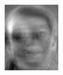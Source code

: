 \begin{frame}
\begin{columns}
\begin{overlayarea}{\textwidth}{\textheight}
{\begin{minipage}[t]{0.15\textwidth}
          \includegraphics[width=\textwidth]{images/eig_docked_image/eig_7.jpeg}
        \end{minipage}
        \begin{minipage}[t]{0.15\textwidth}

\end{minipage}}
\end{overlayarea}
\end{columns}
\end{frame}
